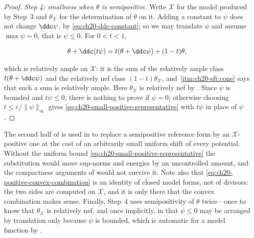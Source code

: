 \begin{proof}
\emph{Step 4: smallness when \(\theta\) is semipositive.}  Write
\(\mathcal X\) for the model produced by Step~3 and \(\theta_{\mathcal X}\)
for the determination of \(\theta\) on it.  Adding a constant
to \(\psi\) does not change \(\ddc\psi\), by
\eqref{eq:ch20-ddc-constant}; so we may translate \(\psi\) and assume
\(\max\psi=0\), that is \(\psi\leq0\).  For \(0<t<1\),

\begin{equation}
\label{eq:ch20-positive-convex-combination}
 \theta+\ddc(t\psi)
 =t(\theta+\ddc\psi)+(1-t)\theta ,
\end{equation}

which is relatively ample on \(\mathcal X\): it is the sum of the relatively
ample class \(t(\theta+\ddc\psi)\) and the relatively nef class
\((1-t)\theta_{\mathcal X}\), and
\,\cref{itm:ch20-sft:cone} says that such a
sum is relatively ample.  Here \(\theta_{\mathcal X}\) is relatively nef by
.
Since \(\psi\) is bounded and \(t\psi\leq0\), there is nothing to prove if
\(\psi=0\); otherwise choosing
\(t\leq\varepsilon/\|\psi\|_\infty\) gives
\eqref{eq:ch20-small-positive-representative} with \(t\psi\) in place of
\(\psi\).
\end{proof}

\begin{remark}
\label{rem:ch20-smallness}
The second half of  is used in
 to replace a semipositive reference
form by an \(\mathcal X\)-positive one at the cost of an arbitrarily small
uniform shift of every potential.  Without the uniform bound
\eqref{eq:ch20-small-positive-representative} the substitution would move
sup-norms and energies by an uncontrolled amount, and the compactness
arguments of  would not survive it.  Note also
that \eqref{eq:ch20-positive-convex-combination} is an identity of closed
model forms, not of divisors: the two sides are computed on
\(\mathcal X\), and it is only there that the convex combination makes
sense.  Finally, Step~4 uses semipositivity of \(\theta\) twice---once to
know that \(\theta_{\mathcal X}\) is relatively nef, and once implicitly, in
that \(\psi\leq0\) may be arranged by translation only because
\(\psi\) is bounded, which is automatic for a model function by
.
\end{remark}

